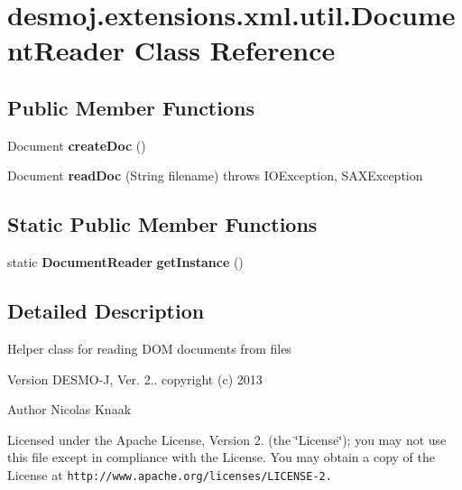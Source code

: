 \section{desmoj.\-extensions.\-xml.\-util.\-Document\-Reader Class Reference}
\label{classdesmoj_1_1extensions_1_1xml_1_1util_1_1_document_reader}
\subsection*{Public Member Functions}
\begin{DoxyCompactItemize}
\item 
Document {\bfseries create\-Doc} ()\label{classdesmoj_1_1extensions_1_1xml_1_1util_1_1_document_reader_adc10aef2f276ea3fa9a3db54911db444}

\item 
Document {\bfseries read\-Doc} (String filename)  throws I\-O\-Exception, S\-A\-X\-Exception \label{classdesmoj_1_1extensions_1_1xml_1_1util_1_1_document_reader_ab43e24903fd04298c1eec38fd601b780}

\end{DoxyCompactItemize}
\subsection*{Static Public Member Functions}
\begin{DoxyCompactItemize}
\item 
static {\bf Document\-Reader} {\bfseries get\-Instance} ()\label{classdesmoj_1_1extensions_1_1xml_1_1util_1_1_document_reader_ad29e4a7011d1b5b9b20acb983a2df528}

\end{DoxyCompactItemize}


\subsection{Detailed Description}
Helper class for reading D\-O\-M documents from files

\begin{DoxyVersion}{Version}
D\-E\-S\-M\-O-\/\-J, Ver. 2.. copyright (c) 2013 
\end{DoxyVersion}
\begin{DoxyAuthor}{Author}
Nicolas Knaak
\end{DoxyAuthor}
Licensed under the Apache License, Version 2. (the \char`\"{}\-License\char`\"{}); you may not use this file except in compliance with the License. You may obtain a copy of the License at {\tt http\-://www.\-apache.\-org/licenses/\-L\-I\-C\-E\-N\-S\-E-\/2.}

